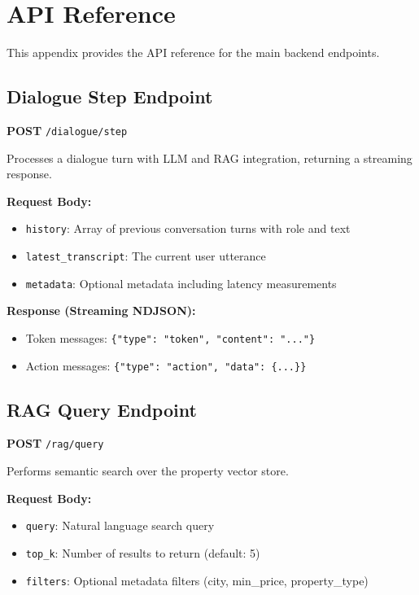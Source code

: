 \appendix
\chapter{API Reference}
\label{app:api}

This appendix provides the API reference for the main backend endpoints.

\section{Dialogue Step Endpoint}

\textbf{POST} \texttt{/dialogue/step}

Processes a dialogue turn with LLM and RAG integration, returning a streaming response.

\textbf{Request Body:}
\begin{itemize}
    \item \texttt{history}: Array of previous conversation turns with role and text
    \item \texttt{latest\_transcript}: The current user utterance
    \item \texttt{metadata}: Optional metadata including latency measurements
\end{itemize}

\textbf{Response (Streaming NDJSON):}
\begin{itemize}
    \item Token messages: \texttt{\{"type": "token", "content": "..."\}}
    \item Action messages: \texttt{\{"type": "action", "data": \{...\}\}}
\end{itemize}

\section{RAG Query Endpoint}

\textbf{POST} \texttt{/rag/query}

Performs semantic search over the property vector store.

\textbf{Request Body:}
\begin{itemize}
    \item \texttt{query}: Natural language search query
    \item \texttt{top\_k}: Number of results to return (default: 5)
    \item \texttt{filters}: Optional metadata filters (city, min\_price, property\_type)
\end{itemize}

